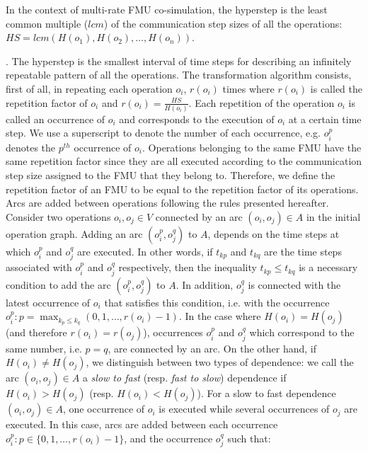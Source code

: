 \begin{definition}
In the context of multi-rate FMU co-simulation, the hyperstep is the least common multiple ($lcm$) of the communication step sizes of all the operations: $HS=lcm(H(o_1),H(o_2), \dots ,H(o_n))$.
\label{def:hyperstep}
\end{definition}
. The hyperstep is the smallest interval of time steps for describing an infinitely repeatable pattern of all the operations. The transformation algorithm consists, first of all, in repeating each operation $o_i$, $r(o_i)$ times where $r(o_i)$ is called the repetition factor of $o_i$ and $r(o_i) = \frac{HS}{H(o_i)}$. Each repetition of the operation $o_i$ is called an occurrence of $o_i$ and corresponds to the execution of $o_i$ at a certain time step. We use a superscript to denote the number of each occurrence, e.g. $o_i^p$ denotes the $p^{th}$ occurrence of $o_i$. Operations belonging to the same FMU have the same repetition factor since they are all executed according to the communication step size assigned to the FMU that they belong to. Therefore, we define the repetition factor of an FMU to be equal to the repetition factor of its operations. Arcs are added between operations following the rules presented hereafter. Consider two operations $o_i, o_j \in V$ connected by an arc $(o_i,o_j) \in A$ in the initial operation graph. Adding an arc $(o_i^p,o_j^q)$ to $A$, depends on the time steps at which $o_i^p$ and $o_j^q$ are executed. In other words, if $t_{kp}$ and $t_{kq}$ are the time steps associated with $o_i^p$ and $o_j^q$ respectively, then the inequality $t_{kp} \leq t_{kq}$ is a necessary condition to add the arc $(o_i^p,o_j^q)$ to $A$. In addition, $o_j^q$ is connected with the latest occurrence of $o_i$ that satisfies this condition, i.e. with the occurrence $o_i^p: p=\max_{k_{p} \leq k_{q}}(0,1, \dots ,r(o_i)-1)$. In the case where $H(o_i) = H(o_j)$ (and therefore $r(o_i) = r(o_j)$), occurrences $o_i^p$ and $o_j^q$ which correspond to the same number, i.e. $p = q$, are connected by an arc. On the other hand, if $H(o_i) \neq H(o_j)$, we distinguish between two types of dependence: we call the arc $(o_i,o_j) \in A$ a \textit{slow to fast} (resp. \textit{fast to slow}) dependence if $H(o_i) > H(o_j)$ (resp. $H(o_i) < H(o_j)$). For a slow to fast dependence $(o_i,o_j) \in A$, one occurrence of $o_i$ is executed while several occurrences of $o_j$ are executed. In this case, arcs are added between each occurrence $o_i^p: p \in \{0,1, \dots ,r(o_i)-1\}$, and the occurrence $o_j^q$ such that:

